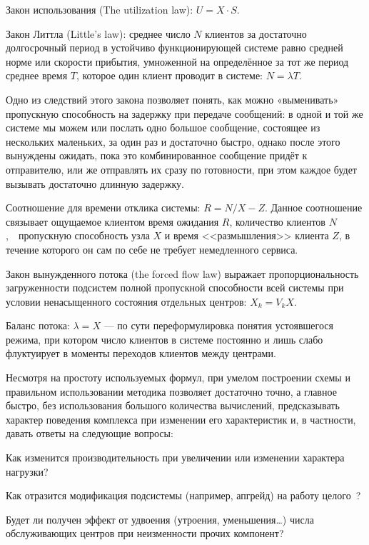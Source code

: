 \begin{itemize*}
\item Закон использования (The utilization law): $U = X \cdot S $.

\item Закон Литтла (\abbr Little's law): среднее число $N$ клиентов за достаточно долгосрочный период в устойчиво функционирующей системе  равно средней норме или скорости прибытия, умноженной на определённое за тот же период среднее время $T$, которое один клиент проводит в системе: $N = \lambda T$.

Одно из следствий этого закона позволяет понять, как можно «выменивать» пропускную способность на задержку при передаче сообщений: в одной и той же системе мы можем или послать одно большое сообщение, состоящее из нескольких маленьких, за один раз  и достаточно быстро, однако после этого вынуждены ожидать, пока это комбинированное сообщение придёт к отправителю, или же отправлять их сразу по готовности, при этом каждое будет вызывать достаточно длинную задержку.


\item Соотношение для времени отклика системы: $R = N/X - Z$. Данное соотношение связывает ощущаемое клиентом время ожидания $R$, количество клиентов $N$,~~пропускную способность узла $X$ и время <<размышления>> клиента $Z$, в течение которого он сам по себе не требует немедленного сервиса.


\item Закон вынужденного потока (\abbr the forced flow law) выражает пропорциональность загруженности подсистем полной пропускной способности всей системы при условии ненасыщенного состояния отдельных центров: $X_k = V_k X$.

\item 
Баланс потока: $\lambda = X$ — по сути переформулировка понятия устоявшегося режима, при котором число клиентов в системе постоянно и лишь слабо флуктуирует в моменты переходов клиентов между центрами.
\end{itemize*}

Несмотря на простоту используемых формул, при умелом построении схемы и правильном использовании методика позволяет достаточно точно, а главное быстро, без использования большого количества вычислений, предсказывать характер поведения комплекса при изменении его характеристик и, в частности, давать ответы на следующие вопросы:

\begin{enumerate*}
\item Как изменится производительность при увеличении или изменении характера нагрузки?

\item Как отразится модификация подсистемы (например, апгрейд) на работу целого~\cite{tulchinski2012}?

\item Будет ли получен эффект от удвоения (утроения, уменьшения\dots) числа  обслуживающих центров при неизменности прочих компонент?
\end{enumerate*}

